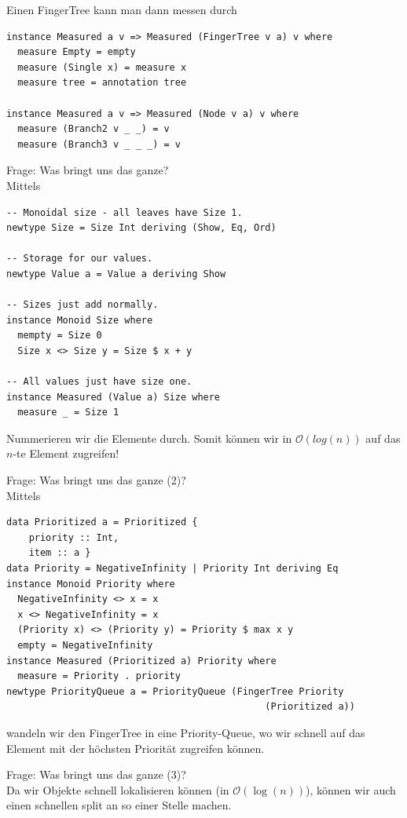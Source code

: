 \documentclass{beamer}
\begin{document}
\begin{frame}[fragile]
Einen FingerTree kann man dann messen durch
\begin{verbatim}
instance Measured a v => Measured (FingerTree v a) v where
  measure Empty = empty
  measure (Single x) = measure x
  measure tree = annotation tree

instance Measured a v => Measured (Node v a) v where
  measure (Branch2 v _ _) = v
  measure (Branch3 v _ _ _) = v
\end{verbatim}
\end{frame}

\begin{frame}[fragile]
Frage: Was bringt uns das ganze?\\\pause
Mittels
\begin{verbatim}
-- Monoidal size - all leaves have Size 1.
newtype Size = Size Int deriving (Show, Eq, Ord)

-- Storage for our values.
newtype Value a = Value a deriving Show

-- Sizes just add normally.
instance Monoid Size where
  mempty = Size 0
  Size x <> Size y = Size $ x + y
  
-- All values just have size one.
instance Measured (Value a) Size where
  measure _ = Size 1
\end{verbatim}
Nummerieren wir die Elemente durch. Somit können wir in $\mathcal{O}(log(n))$ auf das $n$-te Element zugreifen!
\end{frame}

\begin{frame}[fragile]
Frage: Was bringt uns das ganze (2)?\\\pause
Mittels
\begin{verbatim}
data Prioritized a = Prioritized {
    priority :: Int,
    item :: a }
data Priority = NegativeInfinity | Priority Int deriving Eq
instance Monoid Priority where
  NegativeInfinity <> x = x
  x <> NegativeInfinity = x
  (Priority x) <> (Priority y) = Priority $ max x y
  empty = NegativeInfinity
instance Measured (Prioritized a) Priority where
  measure = Priority . priority
newtype PriorityQueue a = PriorityQueue (FingerTree Priority
                                              (Prioritized a))
\end{verbatim}
wandeln wir den FingerTree in eine Priority-Queue, wo wir schnell auf das Element mit der höchsten Priorität zugreifen können.
\end{frame}

\begin{frame}[fragile]
Frage: Was bringt uns das ganze (3)?\\\pause
Da wir Objekte schnell lokalisieren können (in $\mathcal{O}(\log(n))$), können wir auch einen schnellen split an so einer Stelle machen.
\end{frame}
\end{document}
